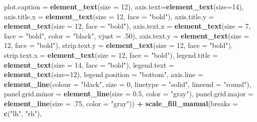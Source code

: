\documentclass[
]{article}
\newenvironment{Shaded}{\begin{snugshade}}{\end{snugshade}}
\newcommand{\DataTypeTok}[1]{\textcolor[rgb]{0.13,0.29,0.53}{#1}}
\newcommand{\DecValTok}[1]{\textcolor[rgb]{0.00,0.00,0.81}{#1}}
\newcommand{\FloatTok}[1]{\textcolor[rgb]{0.00,0.00,0.81}{#1}}
\newcommand{\KeywordTok}[1]{\textcolor[rgb]{0.13,0.29,0.53}{\textbf{#1}}}
\newcommand{\NormalTok}[1]{#1}
\newcommand{\OperatorTok}[1]{\textcolor[rgb]{0.81,0.36,0.00}{\textbf{#1}}}
\newcommand{\StringTok}[1]{\textcolor[rgb]{0.31,0.60,0.02}{#1}}
\begin{document}
\begin{Shaded}
\begin{Highlighting}[]
{{        \DataTypeTok{plot.caption =} \KeywordTok{element_text}\NormalTok{(}\DataTypeTok{size =} \DecValTok{12}\NormalTok{),}
        \DataTypeTok{axis.text=}\KeywordTok{element_text}\NormalTok{(}\DataTypeTok{size=}\DecValTok{14}\NormalTok{),}
        \DataTypeTok{axis.title.x =} \KeywordTok{element_text}\NormalTok{(}\DataTypeTok{size =} \DecValTok{12}\NormalTok{, }\DataTypeTok{face =} \StringTok{"bold"}\NormalTok{),}
        \DataTypeTok{axis.title.y =} \KeywordTok{element_text}\NormalTok{(}\DataTypeTok{size =} \DecValTok{12}\NormalTok{, }\DataTypeTok{face =} \StringTok{"bold"}\NormalTok{),}
        \DataTypeTok{axis.text.x =} \KeywordTok{element_text}\NormalTok{(}\DataTypeTok{size =} \DecValTok{7}\NormalTok{, }\DataTypeTok{face =} \StringTok{"bold"}\NormalTok{, }\DataTypeTok{color =} \StringTok{"black"}\NormalTok{, }\DataTypeTok{vjust =} \FloatTok{.50}\NormalTok{),}
        \DataTypeTok{axis.text.y =} \KeywordTok{element_text}\NormalTok{(}\DataTypeTok{size =} \DecValTok{12}\NormalTok{, }\DataTypeTok{face =} \StringTok{"bold"}\NormalTok{),}
        \DataTypeTok{strip.text.y =} \KeywordTok{element_text}\NormalTok{(}\DataTypeTok{size =} \DecValTok{12}\NormalTok{, }\DataTypeTok{face =} \StringTok{"bold"}\NormalTok{),}
        \DataTypeTok{strip.text.x =} \KeywordTok{element_text}\NormalTok{(}\DataTypeTok{size =} \DecValTok{12}\NormalTok{, }\DataTypeTok{face =} \StringTok{"bold"}\NormalTok{),}
        \DataTypeTok{legend.title =} \KeywordTok{element_text}\NormalTok{(}\DataTypeTok{size =} \DecValTok{14}\NormalTok{, }\DataTypeTok{face =} \StringTok{"bold"}\NormalTok{), }
        \DataTypeTok{legend.text =} \KeywordTok{element_text}\NormalTok{(}\DataTypeTok{size=}\DecValTok{12}\NormalTok{),}
        \DataTypeTok{legend.position =} \StringTok{"bottom"}\NormalTok{,}
        \DataTypeTok{axis.line =} \KeywordTok{element_line}\NormalTok{(}\DataTypeTok{colour =} \StringTok{"black"}\NormalTok{, }
                                 \DataTypeTok{size =} \DecValTok{0}\NormalTok{, }\DataTypeTok{linetype =} \StringTok{"solid"}\NormalTok{, }\DataTypeTok{lineend =} \StringTok{"round"}\NormalTok{),}
        \DataTypeTok{panel.grid.minor =} \KeywordTok{element_line}\NormalTok{(}\DataTypeTok{size =} \FloatTok{0.5}\NormalTok{, }\DataTypeTok{color =} \StringTok{"gray"}\NormalTok{), }
        \DataTypeTok{panel.grid.major =} \KeywordTok{element_line}\NormalTok{(}\DataTypeTok{size =} \FloatTok{.75}\NormalTok{, }\DataTypeTok{color =} \StringTok{"gray"}\NormalTok{)) }\OperatorTok{+}
\StringTok{  }\KeywordTok{scale_fill_manual}\NormalTok{(}\DataTypeTok{breaks =} \KeywordTok{c}\NormalTok{(}\StringTok{"lh"}\NormalTok{, }\StringTok{"rh"}\NormalTok{), }
}}
\end{Highlighting}
\end{Shaded}
\end{document}
